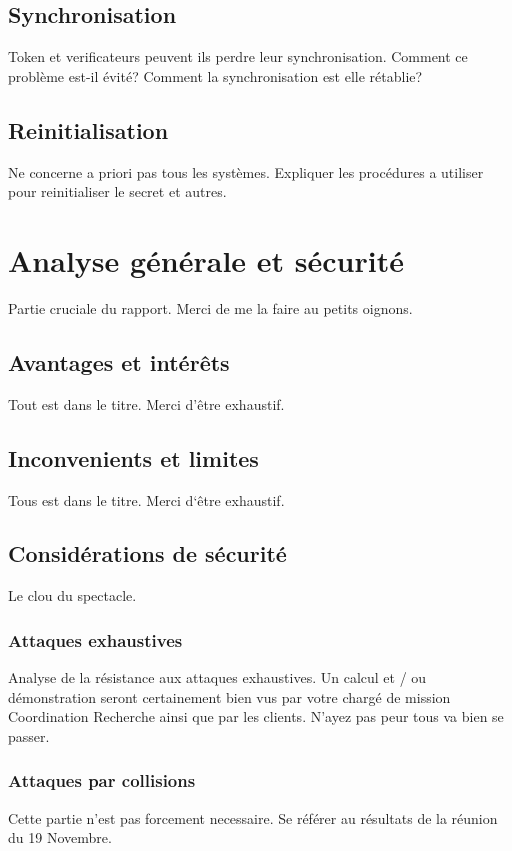 \documentclass[10pt]{article}
\begin{document}
  \subsection{Synchronisation}
  Token et verificateurs peuvent ils perdre leur synchronisation. Comment ce problème est-il évité? Comment la synchronisation est elle rétablie?
  
  \subsection{Reinitialisation}
  Ne concerne a priori pas tous les systèmes. Expliquer les procédures a utiliser pour reinitialiser le secret et autres.
  
\section{Analyse générale et sécurité}
Partie cruciale du rapport. Merci de me la faire au petits oignons.

  \subsection{Avantages et intér\^ets}
  Tout est dans le titre. Merci d'\^etre exhaustif.
  
  \subsection{Inconvenients et limites}
  Tous est dans le titre. Merci d`\^etre exhaustif.
  
  \subsection{Considérations de sécurité}
  Le clou du spectacle.
    \subsubsection{Attaques exhaustives}
    Analyse de la résistance aux attaques exhaustives. Un calcul et / ou démonstration seront certainement bien vus par votre chargé de mission 
    \og{}Coordination Recherche\fg{} ainsi que par les clients. N'ayez pas peur tous va bien se passer.
    
    \subsubsection{Attaques par collisions}
    Cette partie n'est pas forcement necessaire. Se référer au résultats de la réunion du 19 Novembre.
    
\end{document}
